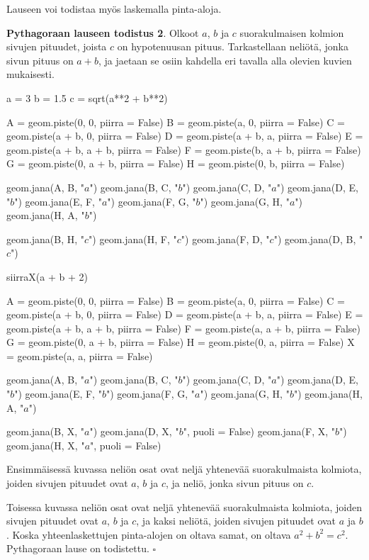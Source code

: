 Lauseen voi todistaa myös laskemalla pinta-aloja.

\textbf{Pythagoraan lauseen todistus 2}. Olkoot $a$, $b$ ja $c$ suorakulmaisen kolmion
sivujen pituudet, joista $c$ on hypotenuusan pituus. Tarkastellaan neliötä, jonka sivun
pituus on $a+b$, ja jaetaan se osiin kahdella eri tavalla alla olevien kuvien mukaisesti.

\begin{kuva}
a = 3
b = 1.5
c = sqrt(a**2 + b**2)

A = geom.piste(0, 0, piirra = False)
B = geom.piste(a, 0, piirra = False)
C = geom.piste(a + b, 0, piirra = False)
D = geom.piste(a + b, a, piirra = False)
E = geom.piste(a + b, a + b, piirra = False)
F = geom.piste(b, a + b, piirra = False)
G = geom.piste(0, a + b, piirra = False)
H = geom.piste(0, b, piirra = False)

geom.jana(A, B, "$a$")
geom.jana(B, C, "$b$")
geom.jana(C, D, "$a$")
geom.jana(D, E, "$b$")
geom.jana(E, F, "$a$")
geom.jana(F, G, "$b$")
geom.jana(G, H, "$a$")
geom.jana(H, A, "$b$")

geom.jana(B, H, "$c$")
geom.jana(H, F, "$c$")
geom.jana(F, D, "$c$")
geom.jana(D, B, "$c$")

siirraX(a + b + 2)

A = geom.piste(0, 0, piirra = False)
B = geom.piste(a, 0, piirra = False)
C = geom.piste(a + b, 0, piirra = False)
D = geom.piste(a + b, a, piirra = False)
E = geom.piste(a + b, a + b, piirra = False)
F = geom.piste(a, a + b, piirra = False)
G = geom.piste(0, a + b, piirra = False)
H = geom.piste(0, a, piirra = False)
X = geom.piste(a, a, piirra = False)

geom.jana(A, B, "$a$")
geom.jana(B, C, "$b$")
geom.jana(C, D, "$a$")
geom.jana(D, E, "$b$")
geom.jana(E, F, "$b$")
geom.jana(F, G, "$a$")
geom.jana(G, H, "$b$")
geom.jana(H, A, "$a$")

geom.jana(B, X, "$a$")
geom.jana(D, X, "$b$", puoli = False)
geom.jana(F, X, "$b$")
geom.jana(H, X, "$a$", puoli = False)
\end{kuva}

Ensimmäisessä kuvassa neliön osat ovat neljä yhtenevää suorakulmaista kolmiota, joiden
sivujen pituudet ovat $a$, $b$ ja $c$, ja neliö, jonka sivun pituus on $c$.

Toisessa kuvassa neliön osat ovat neljä yhtenevää suorakulmaista kolmiota, joiden
sivujen pituudet ovat $a$, $b$ ja $c$, ja kaksi neliötä, joiden sivujen pituudet ovat $a$ ja $b$.
Koska yhteenlaskettujen pinta-alojen on oltava samat, on oltava $a^2 + b^2 = c^2$.
Pythagoraan lause on todistettu. $\square $

